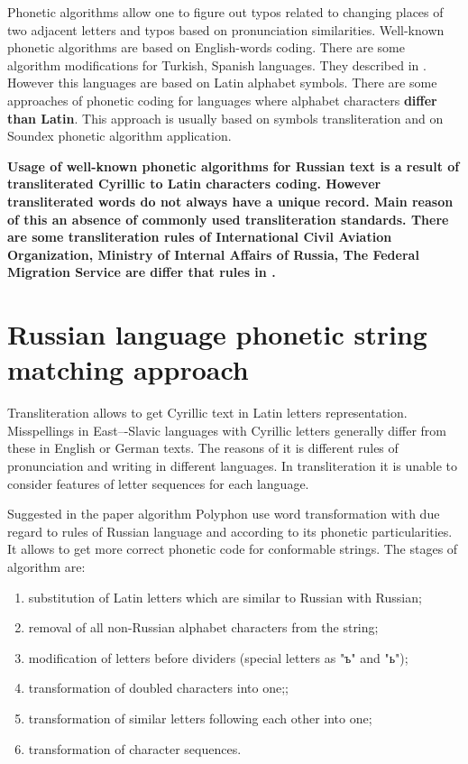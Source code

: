 \documentclass{svproc}
\begin{document}
Phonetic algorithms allow one to figure out typos related to changing places of two adjacent letters and typos based on pronunciation similarities. Well-known phonetic algorithms are based on English-words coding. There are some algorithm modifications for Turkish, Spanish languages. They described in \cite{Alotaibi-2013}. However this languages are based on Latin alphabet symbols. There are some approaches of phonetic coding for languages where alphabet characters\textbf{ differ than Latin}. This approach is usually based on symbols transliteration and on Soundex phonetic algorithm \cite{Soundex} application.

\textbf{Usage of well-known phonetic algorithms for Russian text is a result of transliterated Cyrillic to Latin characters coding. However transliterated words do not always have a unique record. Main reason of this an absence of commonly used transliteration standards. There are some transliteration rules of International Civil Aviation Organization, Ministry of Internal Affairs of Russia, The Federal Migration Service are differ that rules in \cite{GOST-2006}.}

\section{Russian language phonetic string matching approach}
Transliteration allows to get Cyrillic text in Latin letters representation. Misspellings in East–-Slavic languages with Cyrillic letters generally differ from these in English or German texts. The reasons of it is different rules of pronunciation and writing in different languages. In transliteration it is unable to consider features of letter sequences for each language.

Suggested in the paper algorithm Polyphon \cite{Paramonov-2016} use word transformation with due regard to rules of Russian language and according to its phonetic particularities. It allows to get more correct phonetic code for conformable strings. The stages of algorithm are:

\begin{enumerate}
\item substitution of Latin letters which are similar to Russian with Russian;
\item removal of all non-Russian alphabet characters from the string;
\item modification of letters before dividers (special letters as "ъ" and "ь");
\item transformation of doubled characters into one;;
\item transformation of similar letters following each other into one;
\item transformation of character sequences.
\end{enumerate}
\end{document}
